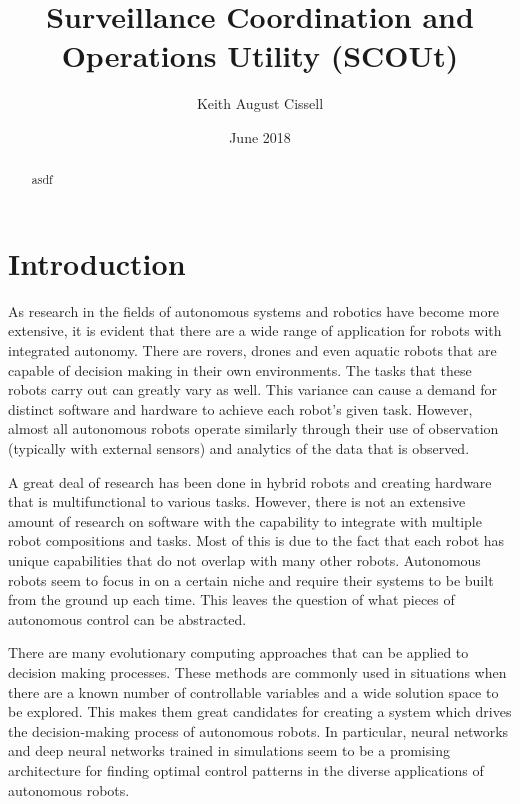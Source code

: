\documentclass[]{report}
\begin{document}
\title{Surveillance Coordination and Operations Utility (SCOUt)}
\author{Keith August Cissell}
\date{June 2018}
\maketitle

\begin{abstract}
  asdf
\end{abstract}

\tableofcontents
\newpage

\section{Introduction}
As research in the fields of autonomous systems and robotics have become more extensive, it is evident that there are a wide range of application for robots with integrated autonomy.  There are rovers, drones and even aquatic robots that are capable of decision making in their own environments. The tasks that these robots carry out can greatly vary as well. This variance can cause a demand for distinct software and hardware to achieve each robot’s given task. However, almost all autonomous robots operate similarly through their use of observation (typically with external sensors) and analytics of the data that is observed.

A great deal of research has been done in hybrid robots and creating hardware that is multifunctional to various tasks. However, there is not an extensive amount of research on software with the capability to integrate with multiple robot compositions and tasks. Most of this is due to the fact that each robot has unique capabilities that do not overlap with many other robots. Autonomous robots seem to focus in on a certain niche and require their systems to be built from the ground up each time. This leaves the question of what pieces of autonomous control can be abstracted.

There are many evolutionary computing approaches that can be applied to decision making processes. These methods are commonly used in situations when there are a known number of controllable variables and a wide solution space to be explored. This makes them great candidates for creating a system which drives the decision-making process of autonomous robots. In particular, neural networks and deep neural networks trained in simulations seem to be a promising architecture for finding optimal control patterns in the diverse applications of autonomous robots.
\end{document}
